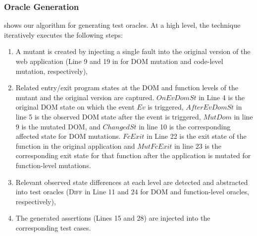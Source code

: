 \subsubsection{Oracle Generation} \label{Sec:oracleGen}

 shows our algorithm for generating test oracles. 
At a high level, the technique iteratively executes the following steps:



\begin{enumerate}[noitemsep]
\item A mutant is created by injecting a single fault into the original version of the web application (Line 9 and 19 in  for DOM mutation and code-level mutation, respectively), 
\item Related entry/exit program states at the DOM and \javascript function levels of the mutant and the original version are captured. $OnEvDomSt$ in Line 4 is the original DOM state on which the event $Ev$ is triggered, $AfterEvDomSt$ in line 5 is the observed DOM state after the event is triggered, $MutDom$ in line 9 is the mutated DOM, and $ChangedSt$ in line 10 is the corresponding affected state for DOM mutations. $FcExit$ in Line 22 is the exit
state of the function in the original application and $MutFcExit$ in line 23 is the corresponding exit state for that function after the application is mutated for function-level mutations.
\item Relevant observed state differences at each level are detected and abstracted into test oracles (\textsc{Diff} in Line 11 and 24 for DOM and function-level oracles,  respectively),
\item The generated assertions (Lines 15 and 28) are injected into the corresponding test cases. %
\end{enumerate}


